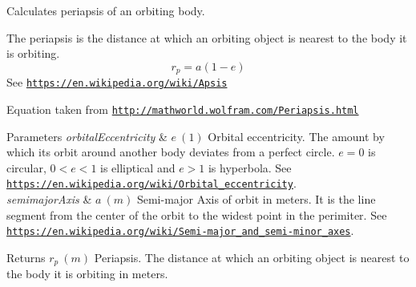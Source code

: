 Calculates periapsis of an orbiting body. 

The periapsis is the distance at which an orbiting object is nearest to the body it is orbiting. \[r_p=a(1-e)\] See \href{https://en.wikipedia.org/wiki/Apsis}{\tt https\+://en.\+wikipedia.\+org/wiki/\+Apsis}

Equation taken from \href{http://mathworld.wolfram.com/Periapsis.html}{\tt http\+://mathworld.\+wolfram.\+com/\+Periapsis.\+html}


\begin{DoxyParams}{Parameters}
{\em orbital\+Eccentricity} & $e\ (1)$ Orbital eccentricity. The amount by which its orbit around another body deviates from a perfect circle. $e=0$ is circular, $ 0<e<1$ is elliptical and $e>1$ is hyperbola. See \href{https://en.wikipedia.org/wiki/Orbital_eccentricity}{\tt https\+://en.\+wikipedia.\+org/wiki/\+Orbital\+\_\+eccentricity}. \\
\hline
{\em semimajor\+Axis} & $a\ (m)$ Semi-\/major Axis of orbit in meters. It is the line segment from the center of the orbit to the widest point in the perimiter. See \href{https://en.wikipedia.org/wiki/Semi-major_and_semi-minor_axes}{\tt https\+://en.\+wikipedia.\+org/wiki/\+Semi-\/major\+\_\+and\+\_\+semi-\/minor\+\_\+axes}. \\
\hline
\end{DoxyParams}
\begin{DoxyReturn}{Returns}
$r_p\ (m)$ Periapsis. The distance at which an orbiting object is nearest to the body it is orbiting in meters. 
\end{DoxyReturn}
